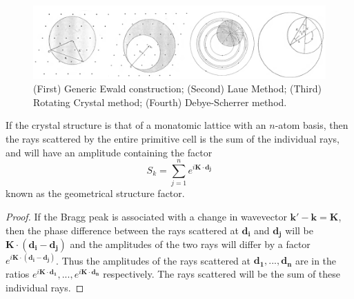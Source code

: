 \documentclass[a4paper]{article}
\begin{document}
\begin{figure}[H]
    \centering
    \includegraphics[width=\linewidth]{ewald.PNG}
    \caption{(First) Generic Ewald construction; (Second) Laue Method; (Third) Rotating Crystal method; (Fourth) Debye-Scherrer method. \cite{ashcroft1976solid}}
\end{figure}
\newpage
\begin{thm}
If the crystal structure is that of a monatomic lattice with an $n$-atom basis, then the rays scattered by the entire primitive cell is the sum of the individual rays, and will have an amplitude containing the factor
$$S_k=\sum_{j=1}^ne^{i\mathbf{K}\cdot\mathbf{d_j}}$$
known as the geometrical structure factor.
\end{thm}
\begin{proof}
If the Bragg peak is associated with a change in wavevector $\mathbf{k'}-\mathbf{k}=\mathbf{K}$, then the phase difference between the rays scattered at $\mathbf{d_i}$ and $\mathbf{d_j}$ will be $\mathbf{K}\cdot(\mathbf{d_i}-\mathbf{d_j})$ and the amplitudes of the two rays will differ by a factor $e^{i\mathbf{K}\cdot(\mathbf{d_i}-\mathbf{d_j})}$. Thus the amplitudes of the rays scattered at $\mathbf{d_1},...,\mathbf{d_n}$ are in the ratios $e^{i\mathbf{K}\cdot\mathbf{d_1}},...,e^{i\mathbf{K}\cdot\mathbf{d_n}}$ respectively. The rays scattered will be the sum of these individual rays.
\end{proof}
\end{document}
